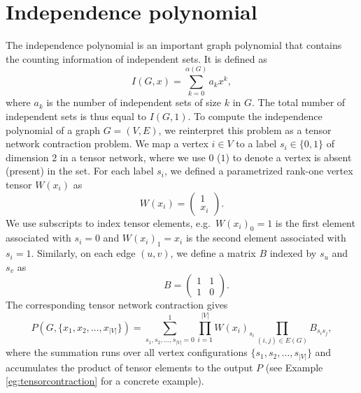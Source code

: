 \documentclass[onefignum, onetabnum]{siamart190516}
\newcommand{\<}{\langle}
\renewcommand{\>}{\rangle}
\newcounter{example}
\begin{document}
\section{Independence polynomial} \label{sec:indpoly}
The independence polynomial is an important graph polynomial that contains the counting information of independent sets. It is defined as
\begin{equation}\label{eq:idpdef}
I(G, x) = \sum_{k=0}^{\alpha(G)} a_k x^k,
\end{equation}
where $a_k$ is the number of independent sets of size $k$ in $G$. The total number of independent sets is thus equal to $I(G, 1)$.
To compute the independence polynomial of a graph $G = (V, E)$, we reinterpret this problem as a tensor network contraction problem.
We map a vertex $i\in V$ to a label $s_i \in \{0, 1\}$ of dimension $2$ in a tensor network, where we use $0$ ($1$) to denote a vertex is absent (present) in the set.
For each label $s_i$, we defined a parametrized rank-one vertex tensor $W(x_i)$ as
\begin{equation}
    W(x_i) = \left(\begin{matrix}
        1 \\
        x_i
    \end{matrix}\right).
\end{equation}
We use subscripts to index tensor elements, e.g.\ $W(x_i)_0=1$ is the first element associated with $s_i=0$ and $W(x_i)_1=x_i$ is the second element associated with $s_i=1$.
Similarly, on each edge $(u, v)$, we define a matrix $B$ indexed by $s_u$ and $s_v$ as
\begin{equation}
    \qquad \quad 
       B = \left(\begin{matrix}
        1  & 1\\
        1 & 0
    \end{matrix}\right). \label{eq:edgetensor}
\end{equation}
The corresponding tensor network contraction gives
\begin{equation}\label{eq:idp}
    P(G, \{x_1, x_{2}, \ldots,x_{|V|}\}) = \sum\limits_{s_1, s_2, \ldots, s_{|V|} = 0}^{1} \prod\limits_{i=1}^{|V|} W(x_i)_{s_i} \prod\limits_{(i,j) \in E(G)} B_{s_i s_j},
\end{equation}
where the summation runs over all vertex configurations $\{s_1, s_{2}, \ldots,s_{|V|}\}$ and accumulates the product of tensor elements to the output $P$ (see Example \ref{eg:tensorcontraction} for a concrete example).
\end{document}
